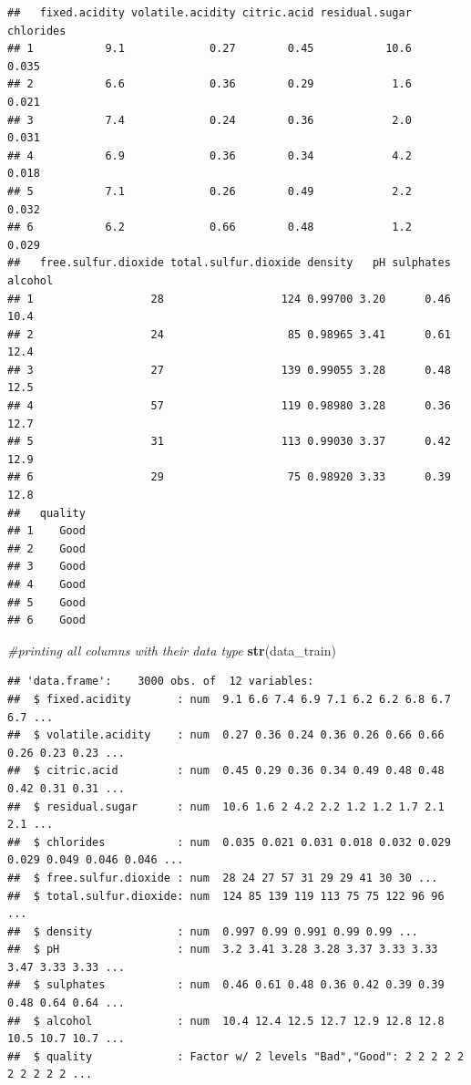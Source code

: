 \documentclass[]{article}
\newenvironment{Shaded}{\begin{snugshade}}{\end{snugshade}}
\newcommand{\CommentTok}[1]{\textcolor[rgb]{0.56,0.35,0.01}{\textit{#1}}}
\newcommand{\KeywordTok}[1]{\textcolor[rgb]{0.13,0.29,0.53}{\textbf{#1}}}
\newcommand{\NormalTok}[1]{#1}
\begin{document}
\begin{verbatim}
##   fixed.acidity volatile.acidity citric.acid residual.sugar chlorides
## 1           9.1             0.27        0.45           10.6     0.035
## 2           6.6             0.36        0.29            1.6     0.021
## 3           7.4             0.24        0.36            2.0     0.031
## 4           6.9             0.36        0.34            4.2     0.018
## 5           7.1             0.26        0.49            2.2     0.032
## 6           6.2             0.66        0.48            1.2     0.029
##   free.sulfur.dioxide total.sulfur.dioxide density   pH sulphates alcohol
## 1                  28                  124 0.99700 3.20      0.46    10.4
## 2                  24                   85 0.98965 3.41      0.61    12.4
## 3                  27                  139 0.99055 3.28      0.48    12.5
## 4                  57                  119 0.98980 3.28      0.36    12.7
## 5                  31                  113 0.99030 3.37      0.42    12.9
## 6                  29                   75 0.98920 3.33      0.39    12.8
##   quality
## 1    Good
## 2    Good
## 3    Good
## 4    Good
## 5    Good
## 6    Good
\end{verbatim}

\begin{Shaded}
\begin{Highlighting}[]
\CommentTok{#printing all columns with their data type}
\KeywordTok{str}\NormalTok{(data_train)}
\end{Highlighting}
\end{Shaded}

\begin{verbatim}
## 'data.frame':    3000 obs. of  12 variables:
##  $ fixed.acidity       : num  9.1 6.6 7.4 6.9 7.1 6.2 6.2 6.8 6.7 6.7 ...
##  $ volatile.acidity    : num  0.27 0.36 0.24 0.36 0.26 0.66 0.66 0.26 0.23 0.23 ...
##  $ citric.acid         : num  0.45 0.29 0.36 0.34 0.49 0.48 0.48 0.42 0.31 0.31 ...
##  $ residual.sugar      : num  10.6 1.6 2 4.2 2.2 1.2 1.2 1.7 2.1 2.1 ...
##  $ chlorides           : num  0.035 0.021 0.031 0.018 0.032 0.029 0.029 0.049 0.046 0.046 ...
##  $ free.sulfur.dioxide : num  28 24 27 57 31 29 29 41 30 30 ...
##  $ total.sulfur.dioxide: num  124 85 139 119 113 75 75 122 96 96 ...
##  $ density             : num  0.997 0.99 0.991 0.99 0.99 ...
##  $ pH                  : num  3.2 3.41 3.28 3.28 3.37 3.33 3.33 3.47 3.33 3.33 ...
##  $ sulphates           : num  0.46 0.61 0.48 0.36 0.42 0.39 0.39 0.48 0.64 0.64 ...
##  $ alcohol             : num  10.4 12.4 12.5 12.7 12.9 12.8 12.8 10.5 10.7 10.7 ...
##  $ quality             : Factor w/ 2 levels "Bad","Good": 2 2 2 2 2 2 2 2 2 2 ...
\end{verbatim}
\end{document}
